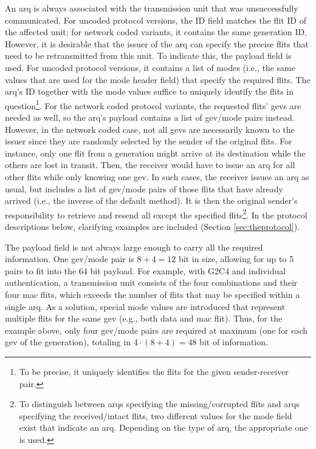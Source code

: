 An \gls{arq} is always associated with the transmission unit that was unsuccessfully communicated. For uncoded protocol versions, the ID field
matches the flit ID of the affected unit; for network coded variants, it contains the same generation ID. However, it is desirable that the issuer of the
\gls{arq} can specify the precise flits that need to be retransmitted from this unit. To indicate this, the payload field is used. For uncoded
protocol versions, it contains a list of modes (i.e., the same values that are used for the mode header field) that specify the required flits. The
\gls{arq}'s ID together with the mode values suffice to uniquely identify the flits in question\footnote{To be precise, it uniquely identifies the flits
for the given sender-receiver pair.}. For the network coded protocol variants, the requested flits' \glspl{gev} are needed as well, so the \gls{arq}'s
payload contains a list of \gls{gev}/mode pairs instead. However, in the network coded case, not all \glspl{gev} are necessarily known to the issuer
since they are randomly selected by the sender of the original flits. For instance, only one flit from a generation might arrive at its destination
while the others are lost in transit. Then, the receiver would have to issue an \gls{arq} for all other flits while only knowing one \gls{gev}. In
such cases, the receiver issues an \gls{arq} as usual, but includes a list of \gls{gev}/mode pairs of those flits that have already arrived (i.e.,
the inverse of the default method). It is then the original sender's responsibility to retrieve and resend all except the specified flits\footnote{To
distinguish between \glspl{arq} specifying the missing/corrupted flits and \glspl{arq} specifying the received/intact flits, two different values for
the mode field exist that indicate an \gls{arq}. Depending on the type of \gls{arq}, the appropriate one is used.}. In the protocol descriptions
below, clarifying examples are included (Section \ref{sec:theprotocol}).

The payload field is not always large enough to carry all the required information. One \gls{gev}/mode pair is $8+4=12$ bit in size, allowing for up to
5 pairs to fit into the 64 bit payload. For example, with G2C4 and individual authentication, a transmission unit consists of the four combinations
and their four \gls{mac} flits, which exceeds the number of flits that may be specified within a single \gls{arq}. As a solution, special mode values
are introduced that represent multiple flits for the same \gls{gev} (e.g., both data and \gls{mac} flit). Thus, for the example above, only four
\gls{gev}/mode pairs are required at maximum (one for each \gls{gev} of the generation), totaling in $4\cdot(8+4)=48$ bit of information.

